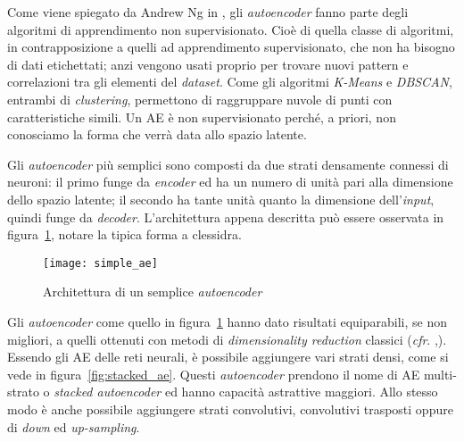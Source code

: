 Come viene spiegato da Andrew Ng in \cite{ng_sparse_ae}, gli \textit{autoencoder} fanno parte degli algoritmi di apprendimento non supervisionato.
Cioè di quella classe di algoritmi, in contrapposizione a quelli ad apprendimento supervisionato, che non ha bisogno di dati etichettati; anzi vengono usati proprio per trovare nuovi pattern e correlazioni tra gli elementi del \textit{dataset}.
Come gli algoritmi \textit{K-Means} e \textit{DBSCAN}, entrambi di \textit{clustering}, permettono di raggruppare nuvole di punti con caratteristiche simili. %
Un AE è non supervisionato perché, a priori, non conosciamo la forma che verrà data allo spazio latente. %

Gli \textit{autoencoder} più semplici sono composti da due strati densamente connessi di neuroni: il primo funge da \textit{encoder} ed ha un numero di unità pari alla dimensione dello spazio latente; il secondo ha tante unità quanto la dimensione dell'\textit{input}, quindi funge da \textit{decoder}.
L'architettura appena descritta può essere osservata in figura~\ref{fig:semplice_ae}, notare la tipica forma a clessidra.

\begin{figure}[ht] %
  \begin{center}
    \centering\texttt{[image: simple\_ae]}
  \end{center}
  \caption{Architettura di un semplice \textit{autoencoder}}
  \label{fig:semplice_ae}
\end{figure}

Gli \textit{autoencoder} come quello in figura~\ref{fig:semplice_ae} hanno dato risultati equiparabili, se non migliori, a quelli ottenuti con metodi di \textit{dimensionality reduction} classici (\textit{cfr}. \cite{ng_sparse_ae},\cite{pca_vs_ae_1}).
\todo[noline]{\\rivedere\\tutto\\questo\\pezzetto\\}
Essendo gli AE delle reti neurali, è possibile aggiungere vari strati densi, come si vede in figura~\ref{fig:stacked_ae}.
Questi \textit{autoencoder} prendono il nome di AE multi-strato o \textit{stacked autoencoder} ed hanno capacità astrattive maggiori. %
Allo stesso modo è anche possibile aggiungere strati convolutivi, convolutivi trasposti oppure di \textit{down} ed \textit{up-sampling}.


